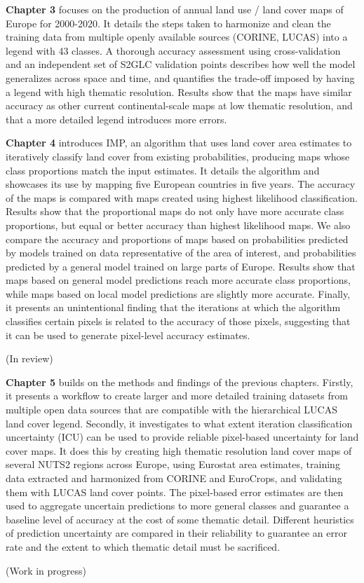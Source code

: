 
\textbf{Chapter 3} focuses on the production of annual land use / land cover maps of Europe for 2000-2020. It details the steps taken to harmonize and clean the training data from multiple openly available sources (CORINE, LUCAS) into a legend with 43 classes. A thorough accuracy assessment using cross-validation and an independent set of S2GLC validation points describes how well the model generalizes across space and time, and quantifies the trade-off imposed by having a legend with high thematic resolution. Results show that the maps have similar accuracy as other current continental-scale maps at low thematic resolution, and that a more detailed legend introduces more errors.


\textbf{Chapter 4} introduces IMP, an algorithm that uses land cover area estimates to iteratively classify land cover from existing probabilities, producing maps whose class proportions match the input estimates. It details the algorithm and showcases its use by mapping five European countries in five years. The accuracy of the maps is compared with maps created using highest likelihood classification. Results show that the proportional maps do not only have more accurate class proportions, but equal or better accuracy than highest likelihood maps. We also compare the accuracy and proportions of maps based on probabilities predicted by models trained on data representative of the area of interest, and probabilities predicted by a general model trained on large parts of Europe. Results show that maps based on general model predictions reach more accurate class proportions, while maps based on local model predictions are slightly more accurate. Finally, it presents an unintentional finding that the iterations at which the algorithm classifies certain pixels is related to the accuracy of those pixels, suggesting that it can be used to generate pixel-level accuracy estimates.

(In review)

\textbf{Chapter 5} builds on the methods and findings of the previous chapters. 
Firstly, it presents a workflow to create larger and more detailed training datasets from multiple open data sources that are compatible with the hierarchical LUCAS land cover legend. 
Secondly, it investigates to what extent iteration classification uncertainty (ICU) can be used to provide reliable pixel-based uncertainty for land cover maps. It does this by creating high thematic resolution land cover maps of several NUTS2 regions across Europe, using Eurostat area estimates, training data extracted and harmonized from CORINE and EuroCrops, and validating them with LUCAS land cover points. 
The pixel-based error estimates are then used to aggregate uncertain predictions to more general classes and guarantee a baseline level of accuracy at the cost of some thematic detail. Different heuristics of prediction uncertainty are compared in their reliability to guarantee an error rate and the extent to which thematic detail must be sacrificed.

(Work in progress)